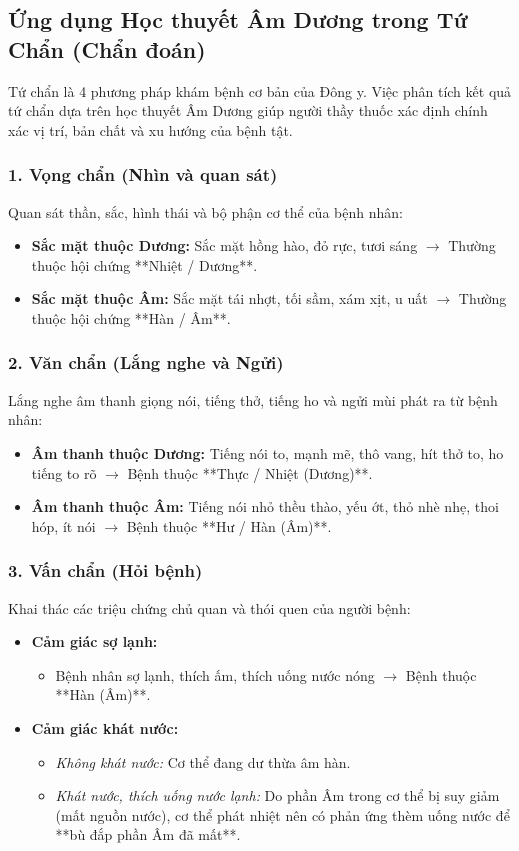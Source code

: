 \subsection{Ứng dụng Học thuyết Âm Dương trong Tứ Chẩn (Chẩn đoán)}

Tứ chẩn là 4 phương pháp khám bệnh cơ bản của Đông y. Việc phân tích kết quả tứ chẩn dựa trên học thuyết Âm Dương giúp người thầy thuốc xác định chính xác vị trí, bản chất và xu hướng của bệnh tật.

\subsubsection{1. Vọng chẩn (Nhìn và quan sát)}
Quan sát thần, sắc, hình thái và bộ phận cơ thể của bệnh nhân:
\begin{itemize}
    \item \textbf{Sắc mặt thuộc Dương:} Sắc mặt hồng hào, đỏ rực, tươi sáng $\rightarrow$ Thường thuộc hội chứng **Nhiệt / Dương**.
    \item \textbf{Sắc mặt thuộc Âm:} Sắc mặt tái nhợt, tối sầm, xám xịt, u uất $\rightarrow$ Thường thuộc hội chứng **Hàn / Âm**.
\end{itemize}

\subsubsection{2. Văn chẩn (Lắng nghe và Ngửi)}
Lắng nghe âm thanh giọng nói, tiếng thở, tiếng ho và ngửi mùi phát ra từ bệnh nhân:
\begin{itemize}
    \item \textbf{Âm thanh thuộc Dương:} Tiếng nói to, mạnh mẽ, thô vang, hít thở to, ho tiếng to rõ $\rightarrow$ Bệnh thuộc **Thực / Nhiệt (Dương)**.
    \item \textbf{Âm thanh thuộc Âm:} Tiếng nói nhỏ thều thào, yếu ớt, thỏ nhè nhẹ, thoi hóp, ít nói $\rightarrow$ Bệnh thuộc **Hư / Hàn (Âm)**.
\end{itemize}

\subsubsection{3. Vấn chẩn (Hỏi bệnh)}
Khai thác các triệu chứng chủ quan và thói quen của người bệnh:
\begin{itemize}
    \item \textbf{Cảm giác sợ lạnh:}
    \begin{itemize}
        \item Bệnh nhân sợ lạnh, thích ấm, thích uống nước nóng $\rightarrow$ Bệnh thuộc **Hàn (Âm)**.
    \end{itemize}
    \item \textbf{Cảm giác khát nước:}
    \begin{itemize}
        \item \textit{Không khát nước:} Cơ thể đang dư thừa âm hàn.
        \item \textit{Khát nước, thích uống nước lạnh:} Do phần Âm trong cơ thể bị suy giảm (mất nguồn nước), cơ thể phát nhiệt nên có phản ứng thèm uống nước để **bù đắp phần Âm đã mất**.
    \end{itemize}
\end{itemize}

